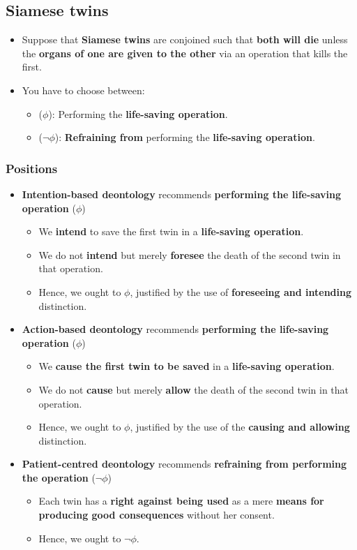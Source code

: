 \documentclass[11pt]{article}
\begin{document}
\subsection{Siamese twins}
\label{sec:org2df6865}
\begin{itemize}
\item Suppose that \textbf{Siamese twins} are conjoined such that \textbf{both will die} unless the \textbf{organs of one are given to the other} via an operation that kills the first.
\item You have to choose between:
\begin{itemize}
\item (\(\phi\)): Performing the \textbf{life-saving operation}.
\item (\(\neg \phi\)): \textbf{Refraining from} performing the \textbf{life-saving operation}.
\end{itemize}
\end{itemize}
\subsubsection{Positions}
\label{sec:org0b5902e}
\begin{itemize}
\item \textbf{Intention-based deontology} recommends \textbf{performing the life-saving operation} (\(\phi\))
\begin{itemize}
\item We \textbf{intend} to save the first twin in a \textbf{life-saving operation}.
\item We do not \textbf{intend} but merely \textbf{foresee} the death of the second twin in that operation.
\item Hence, we ought to \(\phi\), justified by the use of \textbf{foreseeing and intending} distinction.
\end{itemize}
\item \textbf{Action-based deontology} recommends \textbf{performing the life-saving operation} (\(\phi\))
\begin{itemize}
\item We \textbf{cause the first twin to be saved} in a \textbf{life-saving operation}.
\item We do not \textbf{cause} but merely \textbf{allow} the death of the second twin in that operation.
\item Hence, we ought to \(\phi\), justified by the use of the \textbf{causing and allowing} distinction.
\end{itemize}
\item \textbf{Patient-centred deontology} recommends \textbf{refraining from performing the operation} (\(\neg \phi\))
\begin{itemize}
\item Each twin has a \textbf{right against being used} as a mere \textbf{means for producing good consequences} without her consent.
\item Hence, we ought to \(\neg \phi\).
\end{itemize}
\end{itemize}
\end{document}

